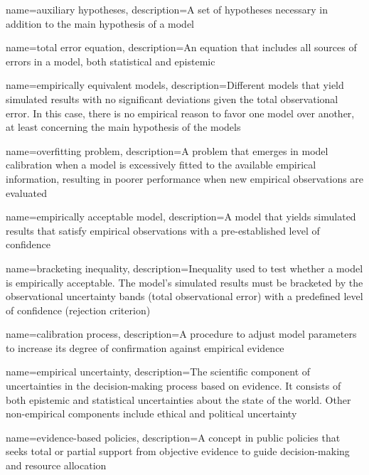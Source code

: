 {
    name=auxiliary hypotheses,
    description={A set of hypotheses necessary in addition to the main hypothesis of a model}
}

{
    name=total error equation,
    description={An equation that includes all sources of errors in a model, both statistical and epistemic}
}

{
    name=empirically equivalent models,
    description={Different models that yield simulated results with no significant deviations given the total observational error. In this case, there is no empirical reason to favor one model over another, at least concerning the main hypothesis of the models}
}

{
    name=overfitting problem,
    description={A problem that emerges in model calibration when a model is excessively fitted to the available empirical information, resulting in poorer performance when new empirical observations are evaluated}
}

{
    name=empirically acceptable model,
    description={A model that yields simulated results that satisfy empirical observations with a pre-established level of confidence}
}

{
    name=bracketing inequality,
    description={Inequality used to test whether a model is empirically acceptable. The model’s simulated results must be bracketed by the observational uncertainty bands (total observational error) with a predefined level of confidence (rejection criterion)}
}


{
    name=calibration process,
    description={A procedure to adjust model parameters to increase its degree of confirmation against empirical evidence}
}

{
    name=empirical uncertainty,
    description={The scientific component of uncertainties in the decision-making process based on evidence. It consists of both epistemic and statistical uncertainties about the state of the world. Other non-empirical components include ethical and political uncertainty}
}

{
    name=evidence-based policies,
    description={A concept in public policies that seeks total or partial support from objective evidence to guide decision-making and resource allocation}
}

